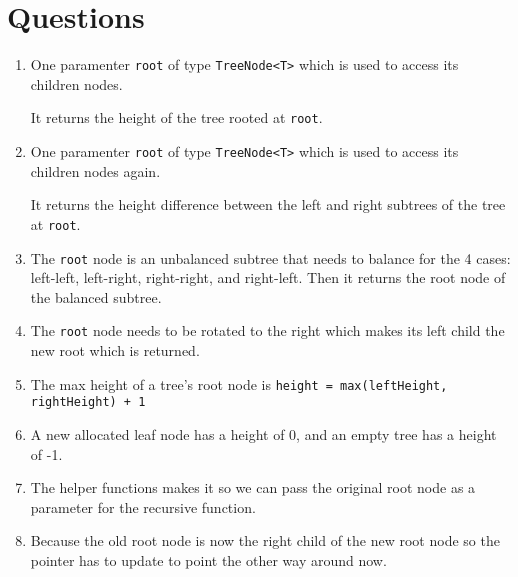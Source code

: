 \documentclass[../main.tex]{subfiles}
\begin{document}
\pagestyle{fancy}


\renewcommand{\thefigure}{\arabic{figure}}
\section*{Questions}

\begin{enumerate}
    \item One paramenter \texttt{root} of type \texttt{TreeNode<T>} which is used
    to access its children nodes.
        
    It returns the height of the tree rooted at \texttt{root}.

    \item One paramenter \texttt{root} of type \texttt{TreeNode<T>} which is used
    to access its children nodes again.

    It returns the height difference between the left and right subtrees of the
    tree at \texttt{root}.

    \item The \texttt{root} node is an unbalanced subtree that needs to balance
    for the 4 cases: left-left, left-right, right-right, and
    right-left. Then it returns the root node of the balanced subtree.

    \item The \texttt{root} node needs to be rotated to the right which makes its
    left child the new root which is returned.

    \item The max height of a tree's root node is \texttt{height = max(leftHeight, rightHeight) + 1}

    \item A new allocated leaf node has a height of 0, and an empty tree has a height of -1.
    
    \item The helper functions makes it so we can pass the original root node as a parameter
    for the recursive function.

    \item Because the old root node is now the right child of the new root node so the pointer has
    to update to point the other way around now.
\end{enumerate}
\end{document}

